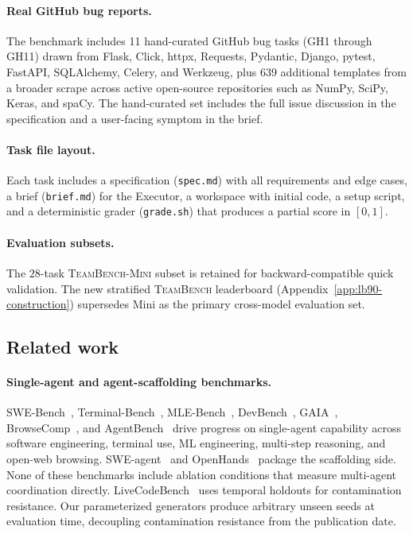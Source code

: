 \documentclass{article}
\begin{document}
\paragraph{Real GitHub bug reports.}
The benchmark includes 11 hand-curated GitHub bug tasks (GH1 through GH11) drawn from Flask, Click, httpx, Requests, Pydantic, Django, pytest, FastAPI, SQLAlchemy, Celery, and Werkzeug, plus 639 additional templates from a broader scrape across active open-source repositories such as NumPy, SciPy, Keras, and spaCy. The hand-curated set includes the full issue discussion in the specification and a user-facing symptom in the brief.

\paragraph{Task file layout.}
Each task includes a specification (\texttt{spec.md}) with all requirements and edge cases, a brief (\texttt{brief.md}) for the Executor, a workspace with initial code, a setup script, and a deterministic grader (\texttt{grade.sh}) that produces a partial score in $[0, 1]$.

\paragraph{Evaluation subsets.}
The $28$-task \textsc{TeamBench-Mini} subset is retained for backward-compatible quick validation. The new stratified \textsc{TeamBench} leaderboard (Appendix~\ref{app:lb90-construction}) supersedes Mini as the primary cross-model evaluation set.

\subsection{Related work}
\label{app:related-extended}

\paragraph{Single-agent and agent-scaffolding benchmarks.}
SWE-Bench~\citep{jimenez2024swebench}, Terminal-Bench~\citep{terminalbench2026}, MLE-Bench~\citep{chan2024mlebench}, DevBench~\citep{li2024devbench}, GAIA~\citep{mialon2023gaia}, BrowseComp~\citep{browsecomp2025}, and AgentBench~\citep{liu2024agentbench} drive progress on single-agent capability across software engineering, terminal use, ML engineering, multi-step reasoning, and open-web browsing. SWE-agent~\citep{yang2024sweagent} and OpenHands~\citep{wang2024opendevin} package the scaffolding side. None of these benchmarks include ablation conditions that measure multi-agent coordination directly. LiveCodeBench~\citep{jain2024livecodebench} uses temporal holdouts for contamination resistance. Our parameterized generators produce arbitrary unseen seeds at evaluation time, decoupling contamination resistance from the publication date.
\end{document}
